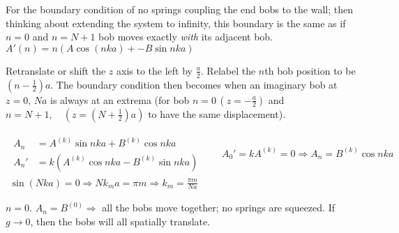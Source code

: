 \documentclass[twoside,10pt]{amsart}
\begin{document}
For the boundary condition of no springs coupling the end bobs to the wall; then thinking about extending the system to infinity, this boundary is the same as if $n=0$ and $n=N+1$ bob moves exactly \emph{with} its adjacent bob.  \\
$A'(n) = n (A \cos{ (nka)} + - B \sin{ nka} )$ 

Retranslate or shift the $z$ axis to the left by $\frac{a}{2}$.  Relabel the $n$th bob position to be $(n-\frac{1}{2})a$.  The boundary condition then becomes when an imaginary bob at $z=0, \, Na$ is always at an extrema (for bob $n=0 \, (z = -\frac{a}{2} )$ and $n=N+1 , \quad (z = (N+ \frac{1}{2} ) a)$ to have the same displacement).  

\[
\begin{gathered}
\begin{aligned}
  A_n & = A^{(k)} \sin{nka} + B^{(k)}\cos{nka} \\
  A_n' & = k (A^{(k)} \cos{nka} -B^{(k)} \sin{nka} ) 
\end{aligned} \quad \quad A_0' = kA^{(k)} = 0 \Longrightarrow A_n = B^{(k)} \cos{nka}  \\
\sin{(Nka)} = 0 \Longrightarrow Nk_m a = \pi m \Longrightarrow \boxed{ k_m = \frac{ \pi m }{ Na} } 
\end{gathered}
\]

$n=0$.  $A_n = B^{(0)} \Longrightarrow$ all the bobs move together; no springs are squeezed.  If $g \to 0$, then the bobs will all spatially translate.  
\end{document}
